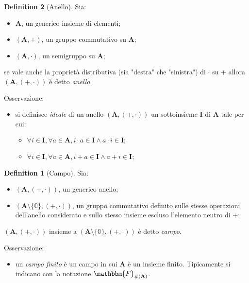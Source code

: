 \documentclass[12pt, a4paper]{report}
\theoremstyle{definition}
\newtheorem{definition}{Definition}[section]
\begin{document}
				\begin{definition}[Anello]
					Sia:
					\begin{itemize}
						\item $\mathbf{A}$, un generico insieme di elementi;
						\item $(\mathbf{A},+)$, un gruppo commutativo su $\mathbf{A}$;
						\item $(\mathbf{A},\cdot)$, un semigruppo su $\mathbf{A}$;  
					\end{itemize}
					\begin{center}
						se vale anche la proprietà distributiva (sia "destra" che "sinistra") di $\cdot$ su + allora $(\mathbf{A}, (+,\cdot))$ è detto \emph{anello}.
					\end{center}
					Osservazione:
					\begin{itemize}
						\item si definisce \emph{ideale} di un anello $(\mathbf{A}, (+,\cdot))$ un sottoinsieme $\mathbf{I}$ di $\mathbf{A}$ tale per cui:
							\begin{itemize}
								\item $\forall i\in \mathbf{I},\forall a\in \mathbf{A}, i\cdot a \in \mathbf{I} \wedge a\cdot i\in \mathbf{I}$;
								\item $\forall i\in \mathbf{I},\forall a\in \mathbf{A}, i+a \in \mathbf{I} \wedge a+i\in \mathbf{I}$;
							\end{itemize}
					\end{itemize}
				\begin{definition}[Campo]
					Sia:
					\begin{itemize}
						\item $(\mathbf{A}, (+,\cdot))$, un generico anello;
						\item $(\mathbf{A}\setminus \{\mathbb{0}\}, (+,\cdot))$, un gruppo commutativo definito sulle stesse operazioni dell'anello considerato e sullo stesso insieme escluso l'elemento neutro di +;
					\end{itemize}
					\begin{center}
						$(\mathbf{A}, (+,\cdot))$ insieme a $(\mathbf{A\setminus \{\mathbb{0}\}}, (+,\cdot))$ è detto \emph{campo}.
					\end{center}
					Osservazione:
					\begin{itemize}
						\item un \emph{campo finito} è un campo in cui $\mathbf{A}$ è un insieme finito. Tipicamente si indicano con la notazione $\mathbbm{F}_{\#\left(\mathbf{A}\right)}$.
					\end{itemize}
				\end{definition}

\end{definition}
\end{document}
